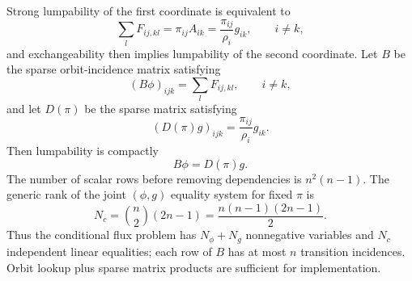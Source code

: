 \documentclass[10pt]{article}
\begin{document}
Strong lumpability of the first coordinate is equivalent to
\begin{equation}\label{eq:lump}
\sum_l F_{ij,kl}=\pi_{ij}A_{ik}=\frac{\pi_{ij}}{\rho_i}g_{ik},\qquad i\ne k,
\end{equation}
and exchangeability then implies lumpability of the second coordinate.  Let $B$ be the sparse orbit-incidence matrix satisfying
\begin{equation}
(B\phi)_{ijk}=\sum_lF_{ij,kl},\qquad i\ne k,
\end{equation}
and let $D(\pi)$ be the sparse matrix satisfying
\begin{equation}
(D(\pi)g)_{ijk}=\frac{\pi_{ij}}{\rho_i}g_{ik}.
\end{equation}
Then lumpability is compactly
\begin{equation}\label{eq:compactlump}
B\phi=D(\pi)g.
\end{equation}
The number of scalar rows before removing dependencies is $n^2(n-1)$.  The generic rank of the joint $(\phi,g)$ equality system for fixed $\pi$ is
\begin{equation}
N_c=\binom n2(2n-1)=\frac{n(n-1)(2n-1)}2.
\end{equation}
Thus the conditional flux problem has $N_\phi+N_g$ nonnegative variables and $N_c$ independent linear equalities; each row of $B$ has at most $n$ transition incidences.  Orbit lookup plus sparse matrix products are sufficient for implementation.
\end{document}
